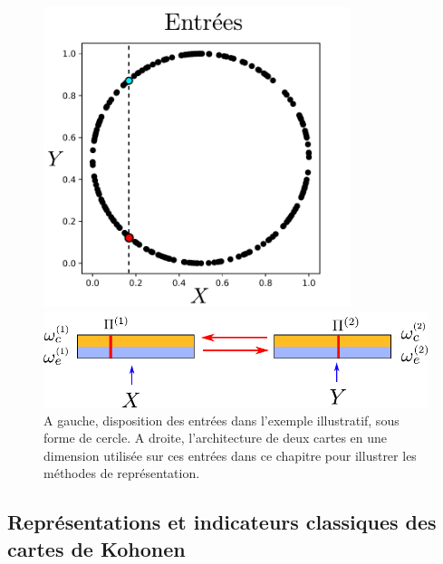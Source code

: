 \documentclass[../main]{subfiles}
\begin{document}
\begin{figure}
\begin{minipage}{0.4\textwidth}
\centering
\includegraphics[width=0.8\textwidth]{2som_inp_noinformation}
\end{minipage}
\begin{minipage}{0.6\textwidth}
\includegraphics[width=\textwidth]{2som_archi}
\end{minipage}
\caption{A gauche, disposition des entrées dans l'exemple illustratif, sous forme de cercle. A droite, l'architecture de deux cartes en une dimension utilisée sur ces entrées dans ce chapitre pour illustrer les méthodes de représentation.\label{fig:exp}}
\end{figure}

\subsection{Représentations et indicateurs classiques des cartes de Kohonen}
\end{document}
